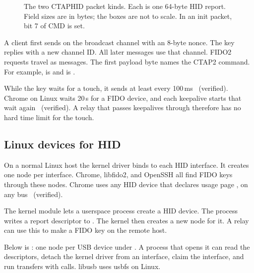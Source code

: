 \begin{figure}[t]
\centering
{}
\caption{The two CTAPHID packet kinds. Each is one 64-byte HID report. Field
sizes are in bytes; the boxes are not to scale. In an init packet, bit 7 of
CMD is set.}
\label{fig:packets}
\end{figure}

A client first sends  on the broadcast channel
 with an 8-byte nonce. The key replies with a new channel
ID. All later messages use that channel. FIDO2 requests travel as
 messages. The first payload byte names the CTAP2
command. For example,  is  and  is
.

While the key waits for a touch, it sends  at least
every 100\,ms~\cite{ctap21} (verified). Chrome on Linux waits 20\,s for a
FIDO device, and each keepalive starts that wait again~\cite{chromefido}
(verified). A relay that passes keepalives through therefore has no hard
time limit for the touch.

\subsection{Linux devices for HID}

On a normal Linux host the kernel driver  binds to each HID
interface. It creates one  node per interface. Chrome,
libfido2, and OpenSSH all find FIDO keys through these nodes. Chrome uses any
HID device that declares usage page , on any bus~\cite{chromefido}
(verified).

The kernel module  lets a userspace process create a HID device.
The process writes a report descriptor to . The kernel then
creates a new  node for it. A relay can use this to make a
 FIDO key on the remote host.

Below  is : one node per USB device under
. A process that opens it can read the descriptors, detach
the kernel driver from an interface, claim the interface, and run transfers
with  calls. libusb uses usbfs on Linux.
